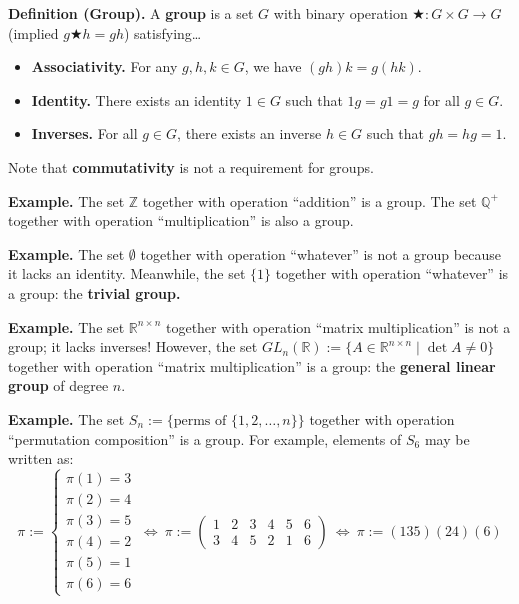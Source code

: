 \textbf{Definition (Group).} A \textbf{group} is a set $G$ with binary operation $\bigstar \! : G \times G \to G$ (implied $g \bigstar h = gh$) satisfying\dots
\begin{itemize}
    \item \textbf{Associativity.} For any $g, h, k \in G$, we have $(gh)k = g(hk)$.
    \item \textbf{Identity.} There exists an identity $1 \in G$ such that $1g = g1 = g$ for all $g \in G$.
    \item \textbf{Inverses.} For all $g \in G$, there exists an inverse $h \in G$ such that $gh = hg = 1$.
\end{itemize}
Note that \textbf{commutativity} is not a requirement for groups.

\textbf{Example.} The set $\mathbb{Z}$ together with operation ``addition'' is a group.  The set $\mathbb{Q}^+$ together with operation ``multiplication'' is also a group.

\textbf{Example.} The set $\emptyset$ together with operation ``whatever'' is not a group because it lacks an identity.  Meanwhile, the set $\{1\}$ together with operation ``whatever'' is a group: the \textbf{trivial group.}

\textbf{Example.} The set $\mathbb{R}^{n \times n}$ together with operation ``matrix multiplication'' is not a group; it lacks inverses!  However, the set $GL_n(\mathbb{R}) := \{ A \in \mathbb{R}^{n \times n} \mid \det A \neq 0 \}$ together with operation ``matrix multiplication'' is a group: the \textbf{general linear group} of degree $n$.

\textbf{Example.} The set $S_n := \{ \text{perms of } \{1, 2, \dots, n\} \}$ together with operation ``permutation composition'' is a group.  For example, elements of $S_6$ may be written as:
\[ \pi := \begin{cases} \pi(1) = 3 \\ \pi(2) = 4 \\ \pi(3) = 5 \\ \pi(4) = 2 \\ \pi(5) = 1 \\ \pi(6) = 6 \end{cases} \ \iff \ \pi := \begin{pmatrix} 1 & 2 & 3 & 4 & 5 & 6 \\ 3 & 4 & 5 & 2 & 1 & 6 \end{pmatrix} \ \iff \ \pi := (135)(24)(6) \]

